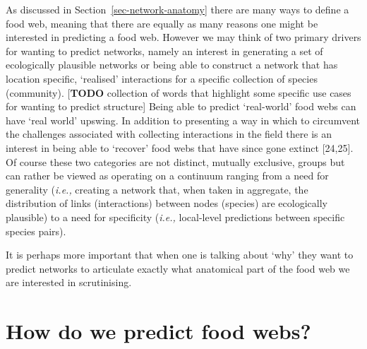 \documentclass[
]{article}
\begin{document}
As discussed in Section~\ref{sec-network-anatomy} there are many ways to
define a food web, meaning that there are equally as many reasons one
might be interested in predicting a food web. However we may think of
two primary drivers for wanting to predict networks, namely an interest
in generating a set of ecologically plausible networks or being able to
construct a network that has location specific, `realised' interactions
for a specific collection of species (community). {[}\textbf{TODO}
collection of words that highlight some specific use cases for wanting
to predict structure{]} Being able to predict `real-world' food webs can
have `real world' upswing. In addition to presenting a way in which to
circumvent the challenges associated with collecting interactions in the
field there is an interest in being able to `recover' food webs that
have since gone extinct {[}24,25{]}. Of course these two categories are
not distinct, mutually exclusive, groups but can rather be viewed as
operating on a continuum ranging from a need for generality
(\emph{i.e.,} creating a network that, when taken in aggregate, the
distribution of links (interactions) between nodes (species) are
ecologically plausible) to a need for specificity (\emph{i.e.,}
local-level predictions between specific species pairs).

It is perhaps more important that when one is talking about `why' they
want to predict networks to articulate exactly what anatomical part of
the food web we are interested in scrutinising.

\section{How do we predict food webs?}\label{sec-network-build}
\end{document}
